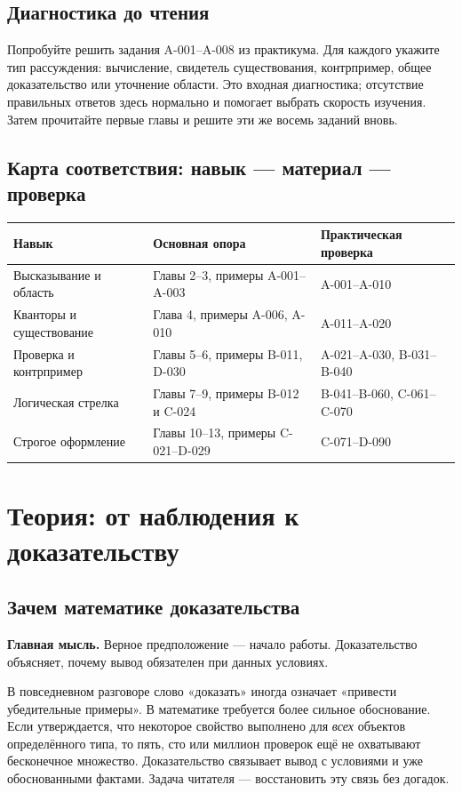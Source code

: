 \documentclass[11pt,a4paper,openany]{book}
\begin{document}
\section{Диагностика до чтения}
Попробуйте решить задания A-001–A-008 из практикума. Для каждого укажите тип рассуждения: вычисление, свидетель существования, контрпример, общее доказательство или уточнение области. Это входная диагностика; отсутствие правильных ответов здесь нормально и помогает выбрать скорость изучения. Затем прочитайте первые главы и решите эти же восемь заданий вновь.
\section{Карта соответствия: навык — материал — проверка}
\begin{longtable}{p{}p{}p{}}\toprule Навык & Основная опора & Практическая проверка\\\midrule\endhead
Высказывание и область & Главы 2–3, примеры A-001–A-003 & A-001–A-010\\
Кванторы и существование & Глава 4, примеры A-006, A-010 & A-011–A-020\\
Проверка и контрпример & Главы 5–6, примеры B-011, D-030 & A-021–A-030, B-031–B-040\\
Логическая стрелка & Главы 7–9, примеры B-012 и C-024 & B-041–B-060, C-061–C-070\\
Строгое оформление & Главы 10–13, примеры C-021–D-029 & C-071–D-090\\\bottomrule\end{longtable}
\chapter{Теория: от наблюдения к доказательству}

\section{Зачем математике доказательства}\label{theory:1}

\begin{keybox}\textbf{Главная мысль.} Верное предположение — начало работы. Доказательство объясняет, почему вывод обязателен при данных условиях.\end{keybox}

В повседневном разговоре слово «доказать» иногда означает «привести убедительные примеры». В математике требуется более сильное обоснование. Если утверждается, что некоторое свойство выполнено для \emph{всех} объектов определённого типа, то пять, сто или миллион проверок ещё не охватывают бесконечное множество. Доказательство связывает вывод с условиями и уже обоснованными фактами. Задача читателя — восстановить эту связь без догадок.
\end{document}

